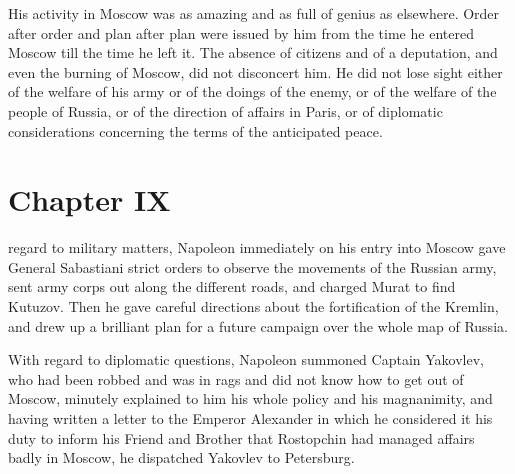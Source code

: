 His activity in Moscow was as amazing and as full of genius as
elsewhere. Order after order and plan after plan were issued by
him from the time he entered Moscow till the time he left it. The
absence of citizens and of a deputation, and even the burning of
Moscow, did not disconcert him. He did not lose sight either of
the welfare of his army or of the doings of the enemy, or of the
welfare of the people of Russia, or of the direction of affairs
in Paris, or of diplomatic considerations concerning the terms of
the anticipated peace.


\chapter*{Chapter IX} \ifaudio {}
\fi

 regard to military matters, Napoleon immediately on his
entry into Moscow gave General Sabastiani strict orders to
observe the movements of the Russian army, sent army corps out
along the different roads, and charged Murat to find
Kutuzov. Then he gave careful directions about the fortification
of the Kremlin, and drew up a brilliant plan for a future
campaign over the whole map of Russia.

With regard to diplomatic questions, Napoleon summoned Captain
Yakovlev, who had been robbed and was in rags and did not know
how to get out of Moscow, minutely explained to him his whole
policy and his magnanimity, and having written a letter to the
Emperor Alexander in which he considered it his duty to inform
his Friend and Brother that Rostopchin had managed affairs badly
in Moscow, he dispatched Yakovlev to Petersburg.

